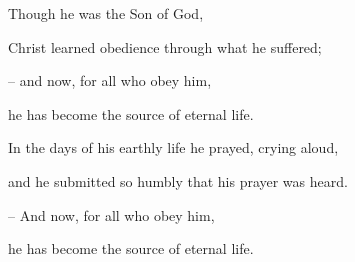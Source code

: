 Though he was the Son of God,\par
Christ learned obedience through what he suffered;\par
– and now, for all who obey him,\par
he has become the source of eternal life.\par
\vspace{5pt}
In the days of his earthly life he prayed, crying aloud,\par
and he submitted so humbly that his prayer was heard.\par
– And now, for all who obey him,\par
he has become the source of eternal life.\par